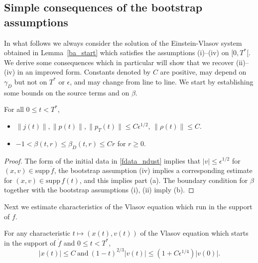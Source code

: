 \documentclass[11pt]{article}
\def\supp{\mathrm{supp}\,}
\begin{document}
\subsection{Simple consequences of the bootstrap assumptions}
%
%
In what follows we always consider the solution of the Einstein-Vlasov
system obtained in Lemma~\ref{ba_start} which satisfies the assumptions
(i)--(iv) on $[0,T^\ast[$. We derive some consequences which in particular
will show that we recover (ii)--(iv) in an improved form.
Constants denoted by $C$ are positive,
may depend on $\gamma_D$  
but not on $T^\ast$ or $\epsilon$, and may change from line to line.
We start by establishing some bounds on the source terms and on $\beta$.
%
\begin{lemma}\label{jandbetaest}
  For all $0\leq t < T^\ast$,
  \begin{itemize}
  \item[(a)]
    $\|j(t)\|, \|p(t)\|, \|p_T(t)\| \leq C \epsilon^{1/2}$, 
    $\|\rho(t)\| \leq C$.   
  \item[(b)]
    $ -1 < \beta(t,r)\leq \beta_D(t,r)
    \leq C r$ for $r\geq 0$.
  \end{itemize}
\end{lemma}
%
%
\begin{proof}
  The form of the initial data in \eqref{fdata_ndust}
  implies that $|v|\leq \epsilon^{1/2}$
  for $(x,v)\in \supp \mathring{f}$, the bootstrap assumption (iv)
  implies a corresponding estimate for $(x,v)\in \supp f(t)$, and
  this implies  part (a).
  The boundary condition for $\beta$ together with the bootstrap
  assumptions (i), (ii) imply (b).
\end{proof}
%
Next we estimate characteristics of the Vlasov equation which
run in the support of $f$.
%
\begin{lemma}\label{charest}
  For any characteristic $t\mapsto (x(t),v(t))$ of the Vlasov equation
  which starts in the support of
  $\mathring{f}$ and $0\leq t < T^\ast$,
  \[
  |x(t)| \leq C
  \ \mbox{and}\ 
  (1-t)^{2/3} |v(t)| \leq
  (1+ C \epsilon^{1/4}) |v(0)| .
  \]
\end{lemma}
%
\end{document}
